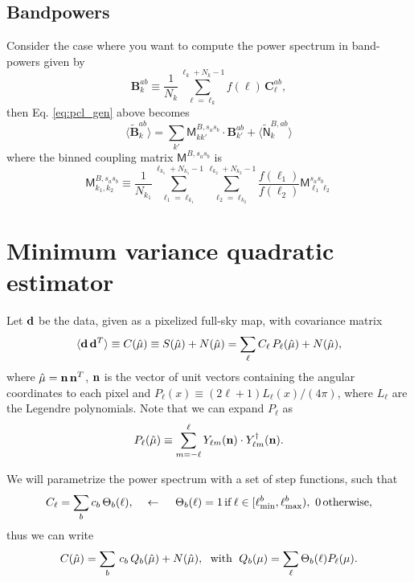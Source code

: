 \documentclass[a4paper,10pt]{article}
\begin{document}
\subsection{Bandpowers}
Consider the case where you want to compute the power spectrum in band-powers given by
\begin{equation}
  \mathbf{B}^{ab}_k\equiv\frac{1}{N_k}\sum_{\ell=\ell_k}^{\ell_k+N_k-1} f(\ell)\,\mathbf{C}^{ab}_\ell,
\end{equation}
then Eq. \ref{eq:pcl_gen} above becomes
\begin{equation}\label{eq:pcl_bin}
  \langle\tilde{\mathbf{B}}^{ab}_k\rangle=\sum_{k'}\mathsf{M}^{B,s_as_b}_{k k'}\cdot\mathbf{B}^{ab}_{k'}+
  \langle\tilde{\mathsf{N}}^{B,ab}_k\rangle
\end{equation}
where the binned coupling matrix $\mathsf{M}^{B,s_as_b}$ is
\begin{equation}
  \mathsf{M}^{B,s_as_b}_{k_1,k_2}\equiv\frac{1}{N_{k_1}}\sum_{\ell_1=\ell_{k_1}}^{\ell_{k_1}+N_{k_1}-1}\sum_{\ell_2=\ell_{k_2}}^{\ell_{k_2}+N_{k_2}-1}\frac{f(\ell_1)}{f(\ell_2)}
  \mathsf{M}^{s_as_b}_{\ell_1\ell_2}
\end{equation}

\section{Minimum variance quadratic estimator}

Let ${\bf d}$ be the data, given as a pixelized full-sky map, with covariance matrix
\begin{equation}
 \langle{\bf d}\,{\bf d}^T\rangle\equiv C(\hat{\mu})\equiv S(\hat{\mu})+N(\hat{\mu})=
 \sum_\ell C_\ell\,P_\ell(\hat{\mu})+N(\hat{\mu}),
\end{equation}
where $\hat{\mu}={\bf n}\,{\bf n}^T$, ${\bf n}$ is the vector of unit vectors containing the angular coordinates to each pixel
and $P_\ell(x)\equiv (2\ell+1) L_\ell(x)/(4\pi)$, where $L_\ell$ are the Legendre polynomials. Note that we can expand
$P_\ell$ as
\begin{equation}
  P_\ell(\hat{\mu})\equiv\sum_{m=-\ell}^\ell Y_{\ell m}({\bf n})\cdot Y^\dag_{\ell m}({\bf n}).
\end{equation}

We will parametrize the power spectrum with a set of step functions, such that
\begin{equation}
 C_\ell=\sum_b c_b\,\Theta_b(\ell),\hspace{12pt}\leftarrow\hspace{12pt}
 \Theta_b(\ell)=1\,{\rm if}\,\ell\in[\ell^b_{\rm min},\ell^b_{\rm max}),\,\,0\,{\rm otherwise},
\end{equation}
thus we can write
\begin{equation}
  C(\hat{\mu})=\sum_b\,c_b\,Q_b(\hat{\mu})+N(\hat{\mu}),\hspace{6pt}{\rm with}\hspace{6pt}
  Q_b(\mu)=\sum_\ell\Theta_b(\ell)P_\ell(\mu).
\end{equation}
\end{document}
